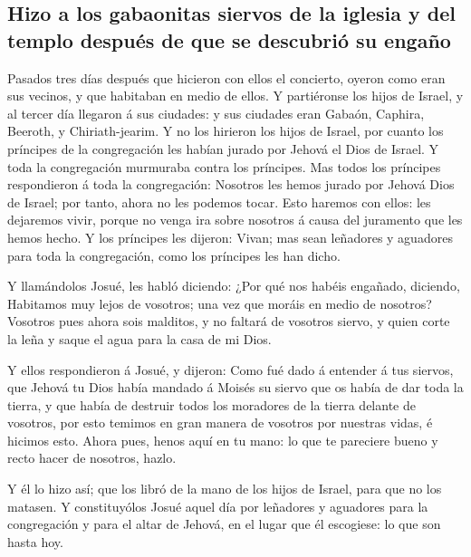 \hypertarget{hizo-a-los-gabaonitas-siervos-de-la-iglesia-y-del-templo-despuuxe9s-de-que-se-descubriuxf3-su-engauxf1o}{%
\subsection{Hizo a los gabaonitas siervos de la iglesia y del templo
después de que se descubrió su
engaño}\label{hizo-a-los-gabaonitas-siervos-de-la-iglesia-y-del-templo-despuuxe9s-de-que-se-descubriuxf3-su-engauxf1o}}

 Pasados tres días después que hicieron con ellos el
concierto, oyeron como eran sus vecinos, y que habitaban en medio de
ellos.  Y partiéronse los hijos de Israel, y al tercer
día llegaron á sus ciudades: y sus ciudades eran Gabaón, Caphira,
Beeroth, y Chiriath-jearim.  Y no los hirieron los hijos
de Israel, por cuanto los príncipes de la congregación les habían jurado
por Jehová el Dios de Israel. Y toda la congregación murmuraba contra
los príncipes.  Mas todos los príncipes respondieron á
toda la congregación: Nosotros les hemos jurado por Jehová Dios de
Israel; por tanto, ahora no les podemos tocar.  Esto
haremos con ellos: les dejaremos vivir, porque no venga ira sobre
nosotros á causa del juramento que les hemos hecho.  Y
los príncipes les dijeron: Vivan; mas sean leñadores y aguadores para
toda la congregación, como los príncipes les han dicho.

 Y llamándolos Josué, les habló diciendo: ¿Por qué nos
habéis engañado, diciendo, Habitamos muy lejos de vosotros; una vez que
moráis en medio de nosotros?  Vosotros pues ahora sois
malditos, y no faltará de vosotros siervo, y quien corte la leña y saque
el agua para la casa de mi Dios.

 Y ellos respondieron á Josué, y dijeron: Como fué dado á
entender á tus siervos, que Jehová tu Dios había mandado á Moisés su
siervo que os había de dar toda la tierra, y que había de destruir todos
los moradores de la tierra delante de vosotros, por esto temimos en gran
manera de vosotros por nuestras vidas, é hicimos esto. 
Ahora pues, henos aquí en tu mano: lo que te pareciere bueno y recto
hacer de nosotros, hazlo.

 Y él lo hizo así; que los libró de la mano de los hijos
de Israel, para que no los matasen.  Y constituyólos
Josué aquel día por leñadores y aguadores para la congregación y para el
altar de Jehová, en el lugar que él escogiese: lo que son hasta hoy.

